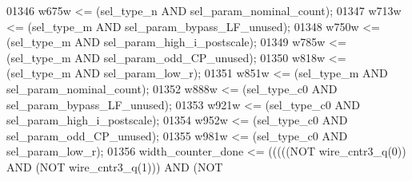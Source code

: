 \begin{DoxyCode}
{01346     \textcolor{vhdlchar}{w675w} \textcolor{vhdlchar}{<=} \textcolor{vhdlchar}{(}\textcolor{vhdlchar}{sel_type_n} \textcolor{keywordflow}{AND} \textcolor{vhdlchar}{sel_param_nominal_count}\textcolor{vhdlchar}{)};
01347     \textcolor{vhdlchar}{w713w} \textcolor{vhdlchar}{<=} \textcolor{vhdlchar}{(}\textcolor{vhdlchar}{sel_type_m} \textcolor{keywordflow}{AND} \textcolor{vhdlchar}{sel_param_bypass_LF_unused}\textcolor{vhdlchar}{)};
01348     \textcolor{vhdlchar}{w750w} \textcolor{vhdlchar}{<=} \textcolor{vhdlchar}{(}\textcolor{vhdlchar}{sel_type_m} \textcolor{keywordflow}{AND} \textcolor{vhdlchar}{sel_param_high_i_postscale}\textcolor{vhdlchar}{)};
01349     \textcolor{vhdlchar}{w785w} \textcolor{vhdlchar}{<=} \textcolor{vhdlchar}{(}\textcolor{vhdlchar}{sel_type_m} \textcolor{keywordflow}{AND} \textcolor{vhdlchar}{sel_param_odd_CP_unused}\textcolor{vhdlchar}{)};
01350     \textcolor{vhdlchar}{w818w} \textcolor{vhdlchar}{<=} \textcolor{vhdlchar}{(}\textcolor{vhdlchar}{sel_type_m} \textcolor{keywordflow}{AND} \textcolor{vhdlchar}{sel_param_low_r}\textcolor{vhdlchar}{)};
01351     \textcolor{vhdlchar}{w851w} \textcolor{vhdlchar}{<=} \textcolor{vhdlchar}{(}\textcolor{vhdlchar}{sel_type_m} \textcolor{keywordflow}{AND} \textcolor{vhdlchar}{sel_param_nominal_count}\textcolor{vhdlchar}{)};
01352     \textcolor{vhdlchar}{w888w} \textcolor{vhdlchar}{<=} \textcolor{vhdlchar}{(}\textcolor{vhdlchar}{sel_type_c0} \textcolor{keywordflow}{AND} \textcolor{vhdlchar}{sel_param_bypass_LF_unused}\textcolor{vhdlchar}{)};
01353     \textcolor{vhdlchar}{w921w} \textcolor{vhdlchar}{<=} \textcolor{vhdlchar}{(}\textcolor{vhdlchar}{sel_type_c0} \textcolor{keywordflow}{AND} \textcolor{vhdlchar}{sel_param_high_i_postscale}\textcolor{vhdlchar}{)};
01354     \textcolor{vhdlchar}{w952w} \textcolor{vhdlchar}{<=} \textcolor{vhdlchar}{(}\textcolor{vhdlchar}{sel_type_c0} \textcolor{keywordflow}{AND} \textcolor{vhdlchar}{sel_param_odd_CP_unused}\textcolor{vhdlchar}{)};
01355     \textcolor{vhdlchar}{w981w} \textcolor{vhdlchar}{<=} \textcolor{vhdlchar}{(}\textcolor{vhdlchar}{sel_type_c0} \textcolor{keywordflow}{AND} \textcolor{vhdlchar}{sel_param_low_r}\textcolor{vhdlchar}{)};
01356     \textcolor{vhdlchar}{width_counter_done} \textcolor{vhdlchar}{<=} \textcolor{vhdlchar}{(}\textcolor{vhdlchar}{(}\textcolor{vhdlchar}{(}\textcolor{vhdlchar}{(}\textcolor{vhdlchar}{(}\textcolor{keywordflow}{NOT} \textcolor{vhdlchar}{wire_cntr3_q}\textcolor{vhdlchar}{(}\textcolor{vhdllogic}{}\textcolor{vhdllogic}{0}\textcolor{vhdlchar}{)}\textcolor{vhdlchar}{)} \textcolor{keywordflow}{AND} \textcolor{vhdlchar}{(}\textcolor{keywordflow}{NOT} \textcolor{vhdlchar}{wire_cntr3_q}\textcolor{vhdlchar}{(}\textcolor{vhdllogic}{}\textcolor{vhdllogic}{1}\textcolor{vhdlchar}{)}\textcolor{vhdlchar}{)}\textcolor{vhdlchar}{)} \textcolor{keywordflow}{AND} \textcolor{vhdlchar}{(}\textcolor{keywordflow}{NOT} \textcolor{vhdlchar}{
}}
\end{DoxyCode}
